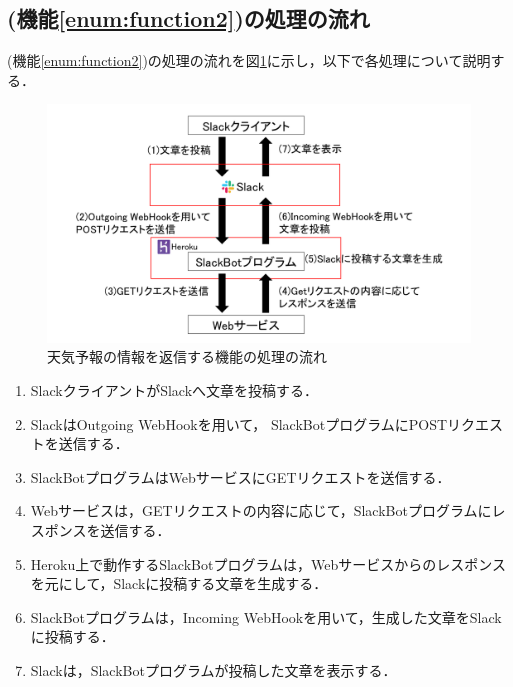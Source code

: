 \documentclass[12pt]{jsarticle}
\begin{document}
\subsection{(機能\ref{enum:function2})の処理の流れ}
(機能\ref{enum:function2})の処理の流れを図\ref{fig:slackbot_flow2}に示し，以下で各処理について説明する．
  \begin{figure}[t]
    \centering
    \includegraphics[width=1\textwidth]{figs/slackbot_flow13.png}
    \caption{天気予報の情報を返信する機能の処理の流れ}
    \label{fig:slackbot_flow2}
  \end{figure}

\begin{enumerate}
\item SlackクライアントがSlackへ文章を投稿する．
\item SlackはOutgoing WebHookを用いて，%
  SlackBotプログラムにPOSTリクエストを送信する．
\item\label{enum:request} SlackBotプログラムはWebサービスにGETリクエストを送信する．
\item\label{enum:response} Webサービスは，GETリクエストの内容に応じて，SlackBotプログラムにレスポンスを送信する．
\item Heroku上で動作するSlackBotプログラムは，Webサービスからのレスポンスを元にして，Slackに投稿する文章を生成する．
\item SlackBotプログラムは，Incoming WebHookを用いて，生成した文章をSlackに投稿する．
\item Slackは，SlackBotプログラムが投稿した文章を表示する．
\end{enumerate}
\end{document}
